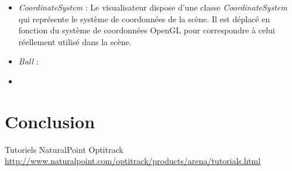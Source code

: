 \documentclass{article}[11pt]
\begin{document}
\begin{itemize}
\item \textit{CoordinateSystem} : Le visualisateur dispose d'une classe \textit{CoordinateSystem} qui représente le système de coordonnées de la scène. Il est déplacé en fonction du système de coordonnées OpenGL pour correspondre à celui réellement utilisé dans la scène.
\item \textit{Ball} : 
\item 
\end{itemize}



\section{Conclusion}


\begin{thebibliography}{}
  Tutoriels NaturalPoint Optitrack \\
  \url{http://www.naturalpoint.com/optitrack/products/arena/tutorials.html}

\end{thebibliography} 
\end{document}
